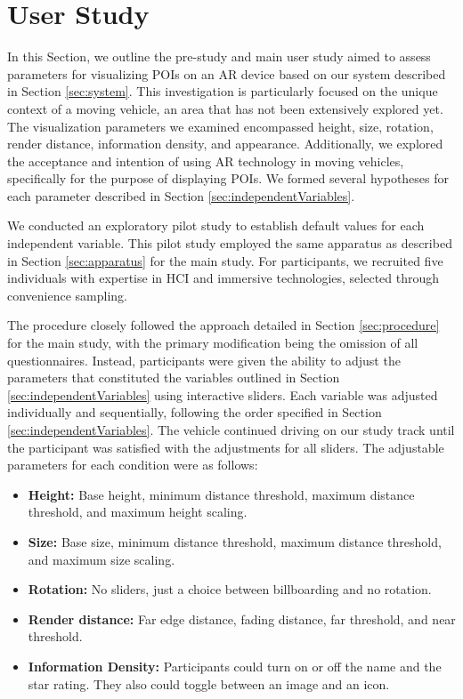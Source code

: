\section{User Study}
\label{section:study}
In this Section, we outline the pre-study and main user study aimed to assess parameters for visualizing POIs on an AR device based on our system described in Section \ref{sec:system}. This investigation is particularly focused on the unique context of a moving vehicle, an area that has not been extensively explored yet. The visualization parameters we examined encompassed height, size, rotation, render distance, information density, and appearance. Additionally, we explored the acceptance and intention of using AR technology in moving vehicles, specifically for the purpose of displaying POIs. We formed several hypotheses for each parameter described in Section \ref{sec:independentVariables}. 

We conducted an exploratory pilot study to establish default values for each independent variable. This pilot study employed the same apparatus as described in Section \ref{sec:apparatus} for the main study. For participants, we recruited five individuals with expertise in HCI and immersive technologies, selected through convenience sampling.

The procedure closely followed the approach detailed in Section \ref{sec:procedure} for the main study, with the primary modification being the omission of all questionnaires. Instead, participants were given the ability to adjust the parameters that constituted the variables outlined in Section \ref{sec:independentVariables} using interactive sliders. Each variable was adjusted individually and sequentially, following the order specified in Section \ref{sec:independentVariables}. The vehicle continued driving on our study track until the participant was satisfied with the adjustments for all sliders. The adjustable parameters for each condition were as follows:
\begin{itemize}
    \item \textbf{Height:} Base height, minimum distance threshold, maximum distance threshold, and maximum height scaling.
    \item \textbf{Size:} Base size, minimum distance threshold, maximum distance threshold, and maximum size scaling.
    \item \textbf{Rotation:} No sliders, just a choice between billboarding and no rotation.
    \item \textbf{Render distance:} Far edge distance, fading distance, far threshold, and near threshold.
    \item \textbf{Information Density:} Participants could turn on or off the name and the star rating. They also could toggle between an image and an icon.
\end{itemize}

